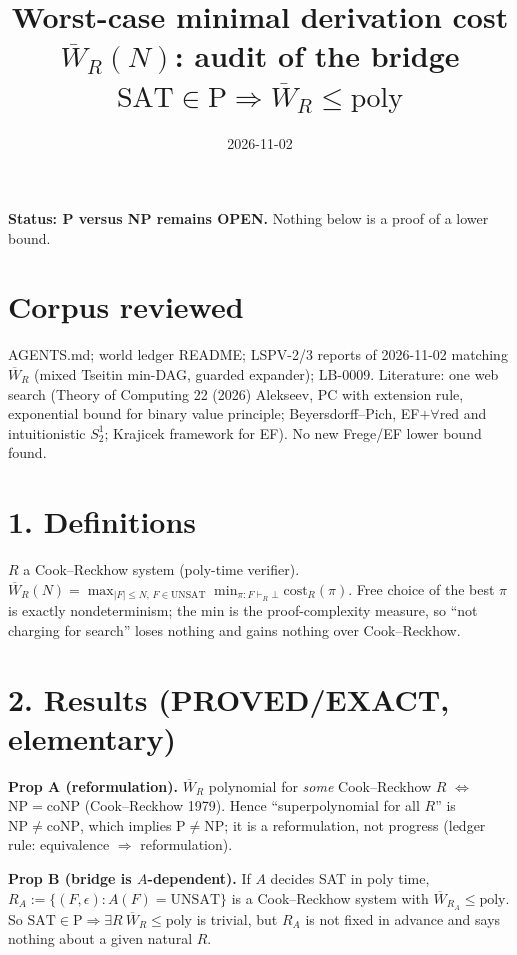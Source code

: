 \documentclass{article}
\begin{document}
\title{Worst-case minimal derivation cost $\overline W_R(N)$: audit of the bridge $\mathrm{SAT}\in\mathrm P\Rightarrow\overline W_R\le\mathrm{poly}$}
\date{2026-11-02}\maketitle
\noindent\textbf{Status: P versus NP remains OPEN.} Nothing below is a proof of a lower bound.

\section*{Corpus reviewed}
AGENTS.md; world ledger README; LSPV-2/3 reports of 2026-11-02 matching $\overline W_R$ (mixed Tseitin min-DAG, guarded expander); LB-0009. Literature: one web search (Theory of Computing 22 (2026) Alekseev, PC with extension rule, exponential bound for binary value principle; Beyersdorff--Pich, EF$+\forall$red and intuitionistic $S^1_2$; Krajicek framework for EF). No new Frege/EF lower bound found.

\section*{1. Definitions}
$R$ a Cook--Reckhow system (poly-time verifier). $\overline W_R(N)=\max_{|F|\le N,\,F\in\mathrm{UNSAT}}\min_{\pi:F\vdash_R\bot}\mathrm{cost}_R(\pi)$. Free choice of the best $\pi$ is exactly nondeterminism; the min is the proof-complexity measure, so ``not charging for search'' loses nothing and gains nothing over Cook--Reckhow.

\section*{2. Results (PROVED/EXACT, elementary)}
\textbf{Prop A (reformulation).} $\overline W_R$ polynomial for \emph{some} Cook--Reckhow $R$ $\iff$ $\mathrm{NP}=\mathrm{coNP}$ (Cook--Reckhow 1979). Hence ``superpolynomial for all $R$'' is $\mathrm{NP}\ne\mathrm{coNP}$, which implies $\mathrm P\ne\mathrm{NP}$; it is a reformulation, not progress (ledger rule: equivalence $\Rightarrow$ reformulation).

\textbf{Prop B (bridge is $A$-dependent).} If $A$ decides SAT in poly time, $R_A:=\{(F,\epsilon): A(F)=\text{UNSAT}\}$ is a Cook--Reckhow system with $\overline W_{R_A}\le\mathrm{poly}$. So $\mathrm{SAT}\in\mathrm P\Rightarrow\exists R\ \overline W_R\le\mathrm{poly}$ is trivial, but $R_A$ is not fixed in advance and says nothing about a given natural $R$.
\end{document}
